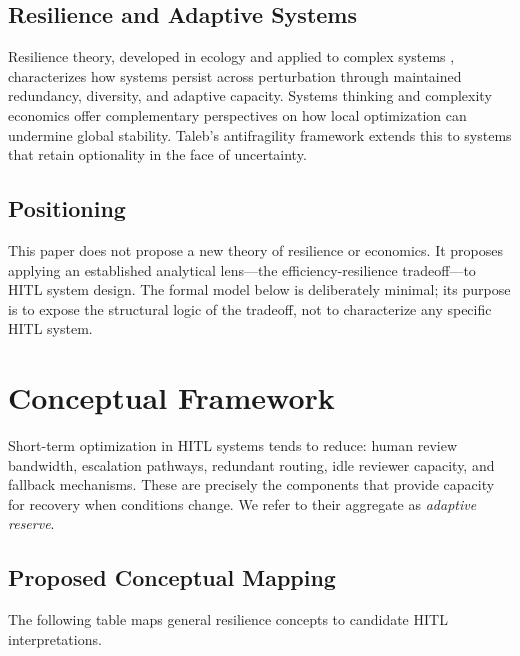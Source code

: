 \documentclass[11pt,a4paper]{article}
\theoremstyle{definition}
\theoremstyle{plain}
\theoremstyle{remark}
\begin{document}
\subsection{Resilience and Adaptive Systems}

Resilience theory, developed in ecology \citep{holling1973} and applied to complex systems \citep{gunderson2002}, characterizes how systems persist across perturbation through maintained redundancy, diversity, and adaptive capacity. Systems thinking \citep{meadows2008} and complexity economics \citep{arthur1999} offer complementary perspectives on how local optimization can undermine global stability. Taleb's antifragility framework \citep{taleb2012} extends this to systems that retain optionality in the face of uncertainty.

\subsection{Positioning}

\begin{cautionbox}
This paper does not propose a new theory of resilience or economics. It proposes applying an established analytical lens---the efficiency-resilience tradeoff---to HITL system design. The formal model below is deliberately minimal; its purpose is to expose the structural logic of the tradeoff, not to characterize any specific HITL system.
\end{cautionbox}

\section{Conceptual Framework}

Short-term optimization in HITL systems tends to reduce: human review bandwidth, escalation pathways, redundant routing, idle reviewer capacity, and fallback mechanisms. These are precisely the components that provide capacity for recovery when conditions change. We refer to their aggregate as \emph{adaptive reserve}.

\subsection{Proposed Conceptual Mapping}

The following table maps general resilience concepts to candidate HITL interpretations.
\end{document}
